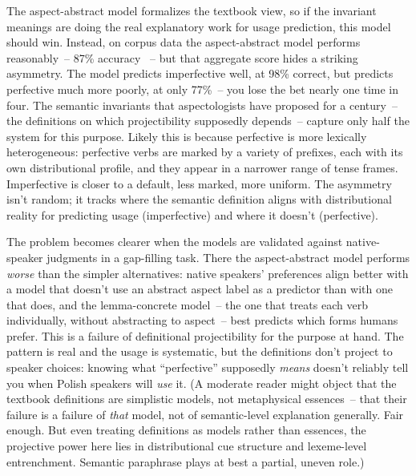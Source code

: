 The aspect-abstract model formalizes the textbook view, so if the invariant meanings are doing the real explanatory work for usage prediction, this model should win. Instead, on corpus data the aspect-abstract model performs reasonably~-- 87\% accuracy \citep{divjak2025learnability}~-- but that aggregate score hides a striking asymmetry. The model predicts imperfective well, at 98\% correct, but predicts perfective much more poorly, at only 77\%~-- you lose the bet nearly one time in four. The semantic invariants that aspectologists have proposed for a century~-- the definitions on which projectibility supposedly depends~-- capture only half the system for this purpose. Likely this is because perfective is more lexically heterogeneous: perfective verbs are marked by a variety of prefixes, each with its own distributional profile, and they appear in a narrower range of tense frames. Imperfective is closer to a default, less marked, more uniform. The asymmetry isn't random; it tracks where the semantic definition aligns with distributional reality for predicting usage (imperfective) and where it doesn't (perfective).

The problem becomes clearer when the models are validated against native-speaker judgments in a gap-filling task. There the aspect-abstract model performs \emph{worse} than the simpler alternatives: native speakers' preferences align better with a model that doesn't use an abstract aspect label as a predictor than with one that does, and the lemma-concrete model~-- the one that treats each verb individually, without abstracting to aspect~-- best predicts which forms humans prefer. This is a failure of definitional projectibility for the purpose at hand. The pattern is real and the usage is systematic, but the definitions don't project to speaker choices: knowing what \enquote{perfective} supposedly \emph{means} doesn't reliably tell you when Polish speakers will \emph{use} it. (A moderate reader might object that the textbook definitions are simplistic models, not metaphysical essences~-- that their failure is a failure of \emph{that} model, not of semantic-level explanation generally. Fair enough. But even treating definitions as models rather than essences, the projective power here lies in distributional cue structure and lexeme-level entrenchment. Semantic paraphrase plays at best a partial, uneven role.)



